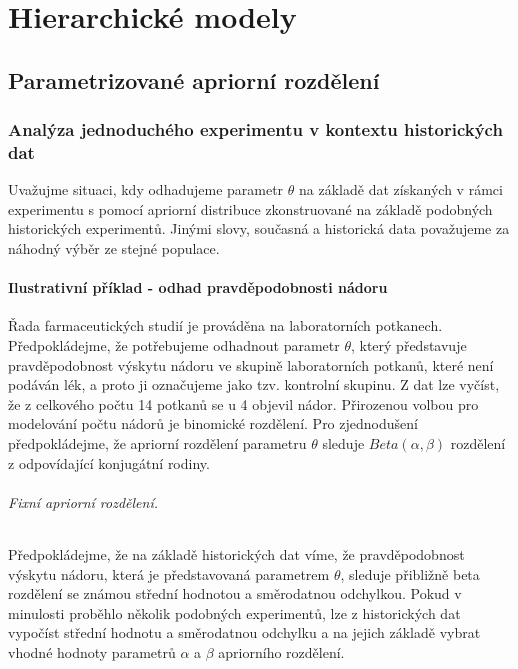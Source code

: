 \chapter{Hierarchické modely}

\section{Parametrizované apriorní rozdělení}

\subsection{Analýza jednoduchého experimentu v kontextu historických dat}

Uvažujme situaci, kdy odhadujeme parametr $\theta$ na základě dat získaných v rámci experimentu s pomocí apriorní distribuce zkonstruované na základě podobných historických experimentů. Jinými slovy, současná a historická data považujeme za náhodný výběr ze stejné populace.

\subsubsection{Ilustrativní příklad - odhad pravděpodobnosti nádoru}

Řada farmaceutických studií je prováděna na laboratorních potkanech. Předpokládejme, že potřebujeme odhadnout parametr $\theta$, který představuje pravděpodobnost výskytu nádoru ve skupině laboratorních potkanů, které není podáván lék, a proto ji označujeme jako tzv. kontrolní skupinu. Z dat lze vyčíst, že z celkového počtu 14 potkanů se u 4 objevil nádor. Přirozenou volbou pro modelování počtu nádorů je binomické rozdělení. Pro zjednodušení předpokládejme, že apriorní rozdělení parametru $\theta$ sleduje $\textit{Beta}(\alpha, \beta)$ rozdělení z odpovídající konjugátní rodiny.

\subparagraph{Fixní apriorní rozdělení.} Předpokládejme, že na základě historických dat víme, že pravděpodobnost výskytu nádoru, která je představovaná parametrem $\theta$, sleduje přibližně beta rozdělení se známou střední hodnotou a směrodatnou odchylkou. Pokud v minulosti proběhlo několik podobných experimentů, lze z historických dat vypočíst střední hodnotu a směrodatnou odchylku a na jejich základě vybrat vhodné hodnoty parametrů $\alpha$ a $\beta$ apriorního rozdělení.

